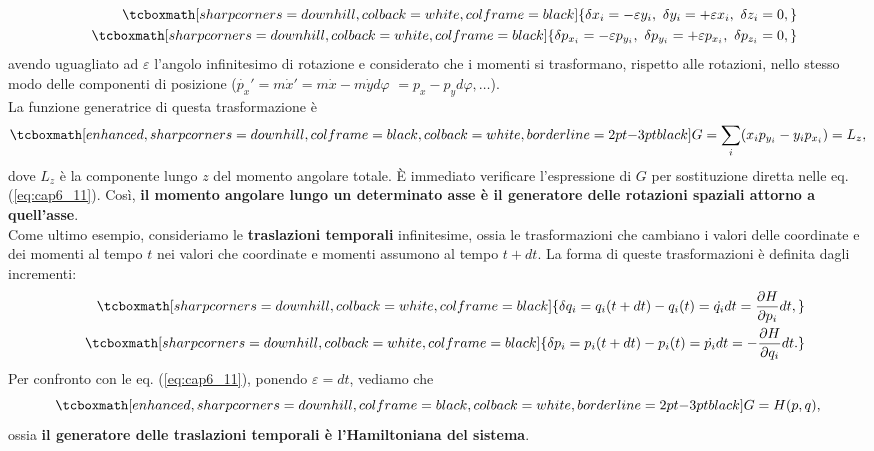 \documentclass[a4paper,12pt,oneside]{book}
\begin{document}
	\begin{eqnarray}
			& & \tcboxmath[sharp corners=downhill, colback=white, colframe=black]{\delta x_i = -\varepsilon y_i, \ \delta y_i = +\varepsilon x_i, \ \delta z_i =0,}\\
			& &\tcboxmath[sharp corners=downhill, colback=white, colframe=black]{ \delta p_{x_i} = -\varepsilon p_{y_i}, \ \delta p_{y_i} = +\varepsilon p_{x_i}, \ \delta p_{z_i} =0,}
	\end{eqnarray}
avendo uguagliato ad $\varepsilon$ l'angolo infinitesimo di rotazione e considerato che i momenti si trasformano, rispetto alle rotazioni, nello stesso modo delle componenti di posizione ($\dot{p_x}'= m \dot{x}'=  m\dot{x}-m\dot{y}d\varphi$ $=p_x-p_yd\varphi , \dots$).\\
La funzione generatrice di questa trasformazione è
	\begin{equation}
		\tcboxmath[enhanced, sharp corners=downhill, colframe=black, colback=white, borderline={2pt}{-3pt}{black}]{
			G= \sum _i (x_ip_{y_i} - y_i p_{x_i}) = L_z ,
			}
	\end{equation}
dove $L_z$ è la componente lungo $z$ del momento angolare totale. È immediato verificare l'espressione di $G$ per sostituzione diretta nelle eq. (\ref{eq:cap6_11}). Così, \textbf{il momento angolare lungo un determinato asse è il generatore delle rotazioni spaziali attorno a quell'asse}.\\

Come ultimo esempio, consideriamo le \textbf{traslazioni temporali} infinitesime, ossia le trasformazioni che cambiano i valori delle coordinate e dei momenti al tempo $t$ nei valori che coordinate e momenti assumono al tempo $t+dt$. La forma di queste trasformazioni è definita dagli incrementi:
	\begin{eqnarray}
		& &\tcboxmath[sharp corners=downhill, colback=white, colframe=black]{
			\delta q_i = q_i(t+dt)-q_i(t) = \dot{q_i} dt = \frac{\partial H}{\partial p_i}dt,} \\
		& &\tcboxmath[sharp corners=downhill, colback=white, colframe=black]{
			\delta p_i = p_i(t+dt)-p_i(t) = \dot{p_i} dt = -\frac{\partial H}{\partial q_i}dt. }
	\end{eqnarray}
Per confronto con le eq. (\ref{eq:cap6_11}), ponendo $\varepsilon = dt$, vediamo che
	\begin{equation}
		\tcboxmath[enhanced, sharp corners=downhill, colframe=black, colback=white, borderline={2pt}{-3pt}{black}]{
			G=H(p,q) ,
			}
	\end{equation}
ossia \textbf{il generatore delle traslazioni temporali è l'Hamiltoniana del sistema}.\\
\end{document}
